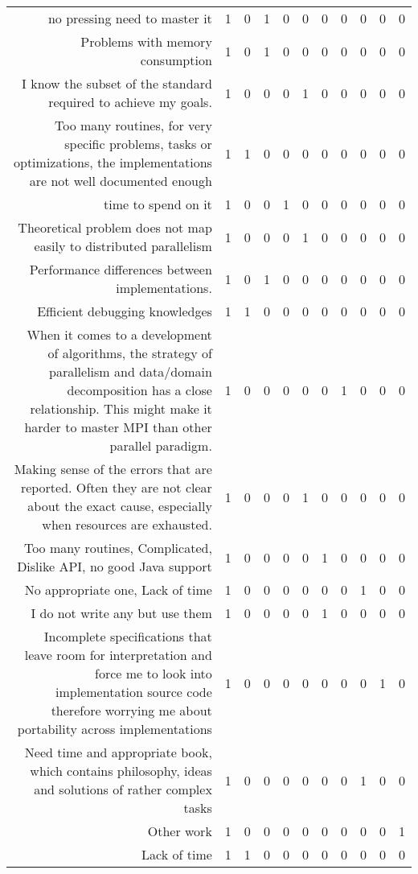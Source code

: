 {\begin{landscape}
\begin{longtable}[htb]{r|c|c|c|c|c|c|c|c|c|c}
{no pressing need to master it} & 1 & 0 & 1 & 0 & 0 & 0 & 0 & 0 & 0 & 0 \\%
{Problems with memory consumption} & 1 & 0 & 1 & 0 & 0 & 0 & 0 & 0 & 0 & 0 \\%
{I know the subset of the standard required to achieve my goals.} & 1 & 0 & 0 & 0 & 1 & 0 & 0 & 0 & 0 & 0 \\%
{Too many routines, for very specific problems, tasks or optimizations, the implementations are not well documented enough} & 1 & 1 & 0 & 0 & 0 & 0 & 0 & 0 & 0 & 0 \\%
{time to spend on it} & 1 & 0 & 0 & 1 & 0 & 0 & 0 & 0 & 0 & 0 \\%
{Theoretical problem does not map easily to distributed parallelism} & 1 & 0 & 0 & 0 & 1 & 0 & 0 & 0 & 0 & 0 \\%
{Performance differences between implementations.} & 1 & 0 & 1 & 0 & 0 & 0 & 0 & 0 & 0 & 0 \\%
{Efficient debugging knowledges} & 1 & 1 & 0 & 0 & 0 & 0 & 0 & 0 & 0 & 0 \\%
{When it comes to a development of algorithms, the strategy of parallelism and  data/domain decomposition has a close relationship. This might make it harder to master MPI than other parallel paradigm.} & 1 & 0 & 0 & 0 & 0 & 0 & 1 & 0 & 0 & 0 \\%
{Making sense of the errors that are reported. Often they are not clear about the exact cause, especially when resources are exhausted.} & 1 & 0 & 0 & 0 & 1 & 0 & 0 & 0 & 0 & 0 \\%
{Too many routines, Complicated, Dislike API, no good Java support} & 1 & 0 & 0 & 0 & 0 & 1 & 0 & 0 & 0 & 0 \\%
{No appropriate one, Lack of time} & 1 & 0 & 0 & 0 & 0 & 0 & 0 & 1 & 0 & 0 \\%
{I do not write any but use them} & 1 & 0 & 0 & 0 & 0 & 1 & 0 & 0 & 0 & 0 \\%
{Incomplete specifications that leave room for interpretation and force me to look into implementation source code therefore worrying me about portability across implementations} & 1 & 0 & 0 & 0 & 0 & 0 & 0 & 0 & 1 & 0 \\%
{Need time and appropriate book, which contains philosophy, ideas and solutions of rather complex tasks} & 1 & 0 & 0 & 0 & 0 & 0 & 0 & 1 & 0 & 0 \\%
{Other work} & 1 & 0 & 0 & 0 & 0 & 0 & 0 & 0 & 0 & 1 \\%
{Lack of time} & 1 & 1 & 0 & 0 & 0 & 0 & 0 & 0 & 0 & 0 \\%

\end{longtable}
\end{landscape}}
